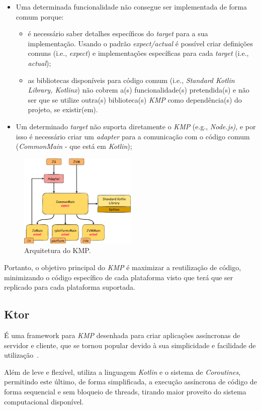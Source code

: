 \begin{itemize}[topsep=0pt,itemsep=0pt,partopsep=0pt, parsep=0pt]
    \item Uma determinada funcionalidade não consegue ser implementada de forma comum porque:
    \begin{itemize}[topsep=0pt,itemsep=0pt,partopsep=0pt, parsep=0pt]
        \item é necessário saber detalhes específicos do \textit{target} para a sua implementação.
        Usando o padrão \textit{expect/actual} é possível criar definições comuns (i.e., \textit{expect}) e implementações específicas para cada \textit{target} (i.e., \textit{actual});
        \item as bibliotecas disponíveis para código comum (i.e., \textit{Standard Kotlin Library, Kotlinx}) não cobrem a(s) funcionalidade(s) pretendida(s) e não ser que se utilize outra(s) biblioteca(s) \textit{KMP} como dependência(s) do projeto, se existir(em).
    \end{itemize}
    \item Um determinado \textit{target} não suporta diretamente o \textit{KMP} (e.g., \textit{Node.js)}, e por isso é necessário criar um \textit{adapter} para a comunicação com o código comum (\textit{CommonMain} - que está em \textit{Kotlin});
\end{itemize}

\begin{figure}[H]
    \centering
    \includegraphics[width=0.5\textwidth]{../docs/imgs/kmp-architecture}
    \caption{Arquitetura do KMP.}
    \label{fig:kmp-architecture}
\end{figure}

Portanto, o objetivo principal do \textit{KMP} é maximizar a reutilização de código, minimizando o código específico de cada plataforma visto que terá que ser replicado para cada plataforma suportada.

\subsection{Ktor}\label{subsec:ktor}

É uma framework para \textit{KMP} desenhada para criar aplicações assíncronas de
servidor e cliente, que se tornou popular devido à sua simplicidade e facilidade de utilização~\cite{ktor}.

Além de leve e flexível, utiliza a linguagem \textit{Kotlin} e o sistema de \textit{Coroutines}, permitindo este último, de forma simplificada, a execução
assíncrona de código de forma sequencial e sem bloqueio de threads, tirando maior proveito do sistema computacional disponível.